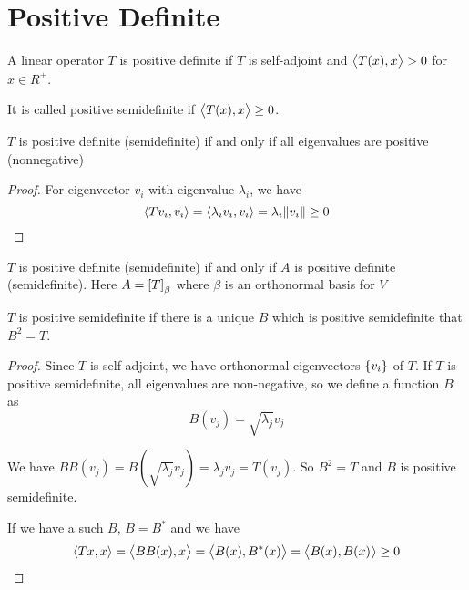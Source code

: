 \section{Positive Definite}

\begin{definition}
    A linear operator $T$ is positive definite if $T$ is self-adjoint and $\left\langle \displaystyle T(x), x \right\rangle > 0$ for $x \in R^+$.
    
    It is called positive semidefinite if $\left\langle \displaystyle T(x), x \right\rangle \geq 0$.
\end{definition}

\begin{theorem}
    $T$ is positive definite (semidefinite) if and only if all eigenvalues are positive (nonnegative)
\end{theorem}
\begin{proof}
    For eigenvector $v_i$ with eigenvalue $\lambda_i$, we have 
    \begin{equation*}
        \left\langle \displaystyle Tv_i, v_i \right\rangle = \left\langle \displaystyle \lambda_i v_i, v_i \right\rangle = \lambda_i \norm{v_i} \geq 0
    \end{equation*}
\end{proof}

\begin{theorem}
$T$ is positive definite (semidefinite) if and only if $A$ is positive definite (semidefinite). Here $A = \coordinate{T}_\beta $ where $\beta$ is an orthonormal basis for $V$    
\end{theorem}

\begin{theorem}
    $T$ is positive semidefinite if there is a unique $B$ which is positive semidefinite that $B^2 = T$.
\end{theorem}
\begin{proof}
    Since $T$ is self-adjoint, we have orthonormal eigenvectors $\set{v_i}$ of $T$. If $T$ is positive semidefinite, all eigenvalues are non-negative, so we define a function $B$ as
    \begin{equation*}
        B(v_j) = \sqrt{\lambda_j} v_j
    \end{equation*}
    
    We have $BB(v_j) = B\left(\sqrt{\lambda_j} v_j\right) = \lambda_j v_j = T(v_j)$. So $B^2= T$ and $B$ is positive semidefinite.
    
    If we have a such $B$, $B=B^*$ and we have
    \begin{equation*}
        \left\langle \displaystyle Tx, x \right\rangle = \left\langle \displaystyle BB(x), x \right\rangle = \left\langle \displaystyle B(x), B^*(x) \right\rangle = \left\langle \displaystyle B(x), B(x) \right\rangle \geq 0
    \end{equation*}
    
\end{proof}

